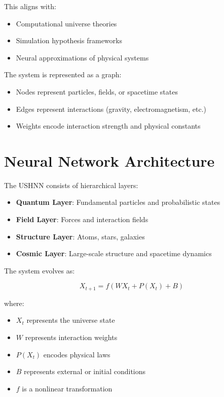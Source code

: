 \documentclass[12pt]{article}
\begin{document}
This aligns with:

\begin{itemize}
\item Computational universe theories
\item Simulation hypothesis frameworks
\item Neural approximations of physical systems
\end{itemize}

The system is represented as a graph:

\begin{itemize}
\item Nodes represent particles, fields, or spacetime states
\item Edges represent interactions (gravity, electromagnetism, etc.)
\item Weights encode interaction strength and physical constants
\end{itemize}

\section{Neural Network Architecture}

The USHNN consists of hierarchical layers:

\begin{itemize}
\item \textbf{Quantum Layer}: Fundamental particles and probabilistic states
\item \textbf{Field Layer}: Forces and interaction fields
\item \textbf{Structure Layer}: Atoms, stars, galaxies
\item \textbf{Cosmic Layer}: Large-scale structure and spacetime dynamics
\end{itemize}

The system evolves as:

\[
X_{t+1} = f(WX_t + P(X_t) + B)
\]

where:
\begin{itemize}
\item $X_t$ represents the universe state
\item $W$ represents interaction weights
\item $P(X_t)$ encodes physical laws
\item $B$ represents external or initial conditions
\item $f$ is a nonlinear transformation
\end{itemize}
\end{document}
